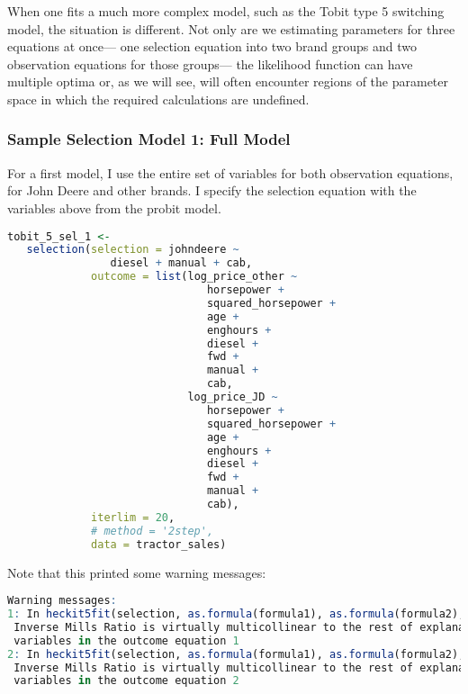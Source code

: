 When one fits a much more complex model, 
such as the Tobit type 5 switching model, 
the situation is different. 
Not only are we estimating parameters for three equations at once---%
one selection equation into two brand groups and two observation equations for those groups---%
the likelihood function can have multiple optima
or, as we will see, will often encounter regions of the parameter space in which the required calculations are undefined. 



\subsubsection{Sample Selection Model 1: Full Model}

For a first model, I use the entire set of variables
for both observation equations, for John Deere and other brands.
I specify the selection equation with the variables above
from the probit model.


\begin{lstlisting}[language=R]
tobit_5_sel_1 <-
   selection(selection = johndeere ~
                diesel + manual + cab,
             outcome = list(log_price_other ~
                               horsepower +
                               squared_horsepower +
                               age +
                               enghours +
                               diesel +
                               fwd +
                               manual +
                               cab,
                            log_price_JD ~
                               horsepower +
                               squared_horsepower +
                               age +
                               enghours +
                               diesel +
                               fwd +
                               manual +
                               cab),
             iterlim = 20,
             # method = '2step',
             data = tractor_sales)
\end{lstlisting}


Note that this printed some warning messages:


\begin{lstlisting}[language=R]
Warning messages:
1: In heckit5fit(selection, as.formula(formula1), as.formula(formula2),  :
 Inverse Mills Ratio is virtually multicollinear to the rest of explanatory
 variables in the outcome equation 1
2: In heckit5fit(selection, as.formula(formula1), as.formula(formula2),  :
 Inverse Mills Ratio is virtually multicollinear to the rest of explanatory
 variables in the outcome equation 2
\end{lstlisting}

